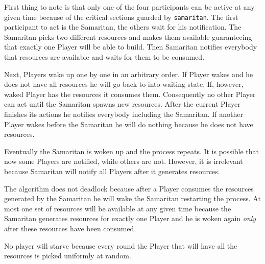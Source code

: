 \documentclass[12pt]{article}
\begin{document}
First thing to note is that only one of the four participants can be
active at any given time because of the critical sections guarded by
\texttt{samaritan}. The first participant to act is the Samaritan, the others
wait for his notification. The Samaritan picks two different resources and
makes them available guaranteeing that exactly one Player will be able to
build. Then Samaritan notifies everybody that resources are available and
waits for them to be consumed.

Next, Players wake up one by one in an arbitrary order. If Player wakes and
he does not have all resources he will go back to into waiting state.  If,
however, waked Player has the resources it consumes them. Consequently no other
Player can act until the Samaritan spawns new resources. After the current
Player finishes its actions he notifies everybody including the Samaritan.
If another Player wakes before the Samaritan he will do nothing because he
does not have resources.

Eventually the Samaritan is woken up and the process repeats. It is possible
that now some Players are notified, while others are not. However, it is
irrelevant because Samaritan will notify all Players after it generates
resources.

The algorithm does not deadlock because after a Player consumes the resources
generated by the Samaritan he will wake the Samaritan restarting the
process. At most one set of resources will be available at any
given time because the Samaritan generates resources for exactly one Player
and he is woken again \emph{only} after these resources have been consumed.

No player will starve because every round the Player that will have all the
resources is picked uniformly at random.
\end{document}
